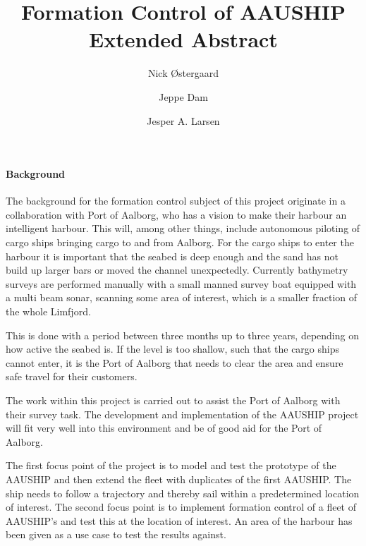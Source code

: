 \documentclass[a4paper,12pt]{article}
\begin{document}
\title{\vspace{-2cm}Formation Control of AAUSHIP\\
\vspace{0.3cm}\small{Extended Abstract}}
\author{Nick Østergaard \and Jeppe Dam \and Jesper A. Larsen}
\maketitle


\paragraph{Background}
The background for the formation control subject of this project
originate in a collaboration with Port of Aalborg, who has a vision to
make their harbour an intelligent harbour. This will, among other
things, include autonomous piloting of cargo ships bringing cargo to and from
Aalborg. For the cargo ships to enter the harbour it is important that
the seabed is deep enough and the sand has not build up larger bars or
moved the channel unexpectedly.  Currently bathymetry surveys are
performed manually with a small manned survey boat equipped with a
multi beam sonar, scanning some area of interest, which is a smaller
fraction of the whole Limfjord.

This is done with a period between three months up to three years,
depending on how active the seabed is. If the level is too shallow,
such that the cargo ships cannot enter, it is the Port of Aalborg that
needs to clear the area and ensure safe travel for their customers.

The work within this project is carried out to assist the Port of
Aalborg with their survey task. The development and implementation of
the AAUSHIP project will fit very well into this environment and be of
good aid for the Port of Aalborg.

The first focus point of the project is to model and test the
prototype of the AAUSHIP and then extend the fleet with duplicates of
the first AAUSHIP. The ship needs to follow a trajectory and thereby
sail within a predetermined location of interest. The second focus
point is to implement formation control of a fleet of AAUSHIP's and
test this at the location of interest. An area of the harbour has been
given as a use case to test the results against.
\end{document}
